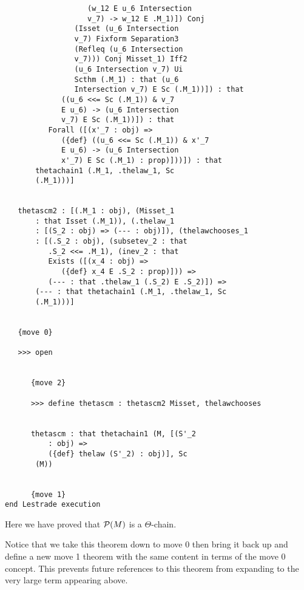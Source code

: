 \documentclass[12pt]{article}
\begin{document}
\begin{verbatim}
                   (w_12 E u_6 Intersection 
                   v_7) -> w_12 E .M_1)]) Conj 
                (Isset (u_6 Intersection 
                v_7) Fixform Separation3 
                (Refleq (u_6 Intersection 
                v_7))) Conj Misset_1) Iff2 
                (u_6 Intersection v_7) Ui 
                Scthm (.M_1) : that (u_6 
                Intersection v_7) E Sc (.M_1))]) : that 
             ((u_6 <<= Sc (.M_1)) & v_7 
             E u_6) -> (u_6 Intersection 
             v_7) E Sc (.M_1))]) : that 
          Forall ([(x'_7 : obj) => 
             ({def} ((u_6 <<= Sc (.M_1)) & x'_7 
             E u_6) -> (u_6 Intersection 
             x'_7) E Sc (.M_1) : prop)]))]) : that 
       thetachain1 (.M_1, .thelaw_1, Sc 
       (.M_1)))]


   thetascm2 : [(.M_1 : obj), (Misset_1 
       : that Isset (.M_1)), (.thelaw_1 
       : [(S_2 : obj) => (--- : obj)]), (thelawchooses_1 
       : [(.S_2 : obj), (subsetev_2 : that 
          .S_2 <<= .M_1), (inev_2 : that 
          Exists ([(x_4 : obj) => 
             ({def} x_4 E .S_2 : prop)])) => 
          (--- : that .thelaw_1 (.S_2) E .S_2)]) => 
       (--- : that thetachain1 (.M_1, .thelaw_1, Sc 
       (.M_1)))]


   {move 0}

   >>> open


      {move 2}

      >>> define thetascm : thetascm2 Misset, thelawchooses


      thetascm : that thetachain1 (M, [(S'_2 
          : obj) => 
          ({def} thelaw (S'_2) : obj)], Sc 
       (M))


      {move 1}
end Lestrade execution
\end{verbatim}

Here we have proved that ${\cal P}(M)$ is a $\Theta$-chain.

Notice that we take this theorem down to move 0 then bring it back up and define a new move 1 theorem with the same content in terms of the move 0 concept.  This prevents
future references to this theorem from expanding to the very large term appearing above.
\end{document}
